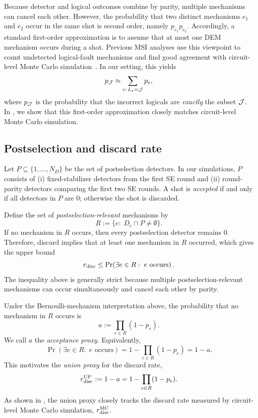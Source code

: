 Because detector and logical outcomes combine by parity, multiple mechanisms can cancel each other.
However, the probability that two distinct mechanisms $e_1$ and $e_2$ occur in the same shot is second order, namely $p_{e_1}p_{e_2}$.
Accordingly, a standard first-order approximation is to assume that at most one DEM mechanism occurs during a shot.
Previous MSI analyses use this viewpoint to count undetected logical-fault mechanisms and find good agreement with circuit-level Monte Carlo simulation~\cite{li_magic_2015,lao_magic_2022,gidney_cleaner_2023}.
In our setting, this yields
\begin{equation}
p_{\mathcal{J}} \approx \sum_{e:\,L_e = \mathcal{J}} p_e,
\end{equation}
where $p_{\mathcal{J}}$ is the probability that the incorrect logicals are \emph{exactly} the subset $\mathcal{J}$.
In , we show that this first-order approximation closely matches circuit-level Monte Carlo simulation.

\subsection{Postselection and discard rate}

Let $P\subseteq\{1,\dots,N_D\}$ be the set of postselection detectors.
In our simulations, $P$ consists of (i) fixed-stabilizer detectors from the first SE round and (ii) round-parity detectors comparing the first two SE rounds.
A shot is \emph{accepted} if and only if all detectors in $P$ are $0$; otherwise the shot is discarded.

Define the set of \emph{postselection-relevant} mechanisms by
\begin{equation}
R := \{e:\; D_e\cap P\neq \emptyset\}.
\label{eq:relevant_mechanisms_set_simplified}
\end{equation}
If no mechanism in $R$ occurs, then every postselection detector remains $0$.
Therefore, discard implies that at least one mechanism in $R$ occurred, which gives the upper bound
\begin{equation}
r_{\rm disc}
\le
\Pr\!\left(\exists e\in R:\; e\text{ occurs}\right).
\end{equation}
The inequality above is generally strict because multiple postselection-relevant mechanisms can occur simultaneously and cancel each other by parity.

Under the Bernoulli-mechanism interpretation above, the probability that no mechanism in $R$ occurs is
\begin{equation}
a := \prod_{e\in R}(1-p_e).
\end{equation}
We call $a$ the \emph{acceptance proxy}.
Equivalently,
\begin{equation}
\Pr\!\left(\exists e\in R:\; e\text{ occurs}\right)
= 1-\prod_{e\in R}(1-p_e)
= 1-a.
\end{equation}
This motivates the \emph{union proxy} for the discard rate,
\begin{equation}
r_{\rm disc}^{\rm UP} := 1-a = 1-\prod_{e\in R}(1-p_e).
\label{eq:rdisc_up_def}
\end{equation}
As shown in , the union proxy closely tracks the discard rate measured by circuit-level Monte Carlo simulation, $r_{\rm disc}^{\rm MC}$.

